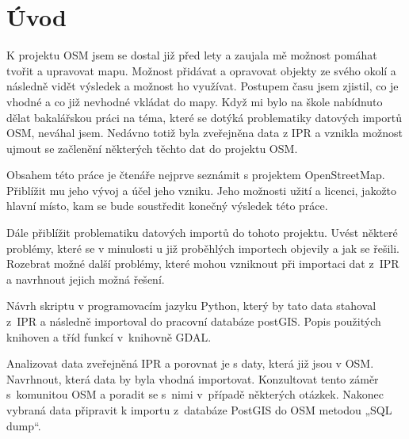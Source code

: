 \chapter{Úvod}
\label{1-uvod}

K projektu OSM jsem se dostal již před lety a zaujala mě možnost pomáhat tvořit 
a upravovat mapu. Možnost přidávat a opravovat objekty ze svého okolí a následně 
vidět výsledek a možnost ho využívat. Postupem času jsem zjistil, co je vhodné a 
co již nevhodné vkládat do mapy. Když mi bylo na škole nabídnuto dělat 
bakalářskou práci na téma, které se dotýká problematiky datových importů OSM,
neváhal jsem. Nedávno totiž byla zveřejněna data z IPR a vznikla možnost ujmout 
se začlenění některých těchto dat do projektu OSM. 

Obsahem této práce je čtenáře nejprve seznámit s projektem OpenStreetMap. 
Přiblížit mu jeho vývoj a účel jeho vzniku. Jeho možnosti užití a licenci, 
jakožto hlavní místo, kam se bude soustředit konečný výsledek této práce.

Dále přiblížit problematiku datových importů do tohoto projektu. Uvést některé 
problémy, které se v minulosti u již proběhlých importech objevily a jak se 
řešili. Rozebrat možné další problémy, které mohou vzniknout při importaci dat 
z~IPR a navrhnout jejich možná řešení. 

Návrh skriptu v programovacím jazyku Python, který by tato data stahoval z~IPR 
a následně importoval do pracovní databáze postGIS. Popis použitých knihoven a 
tříd funkcí v~knihovně GDAL.

Analizovat data zveřejněná IPR a porovnat je s daty, která již jsou v OSM. 
Navrhnout, která data by byla vhodná importovat. Konzultovat tento záměr 
s~komunitou OSM a poradit se s~nimi v~případě některých otázkek. Nakonec 
vybraná data připravit k importu z~databáze PostGIS do OSM metodou „SQL dump“.
